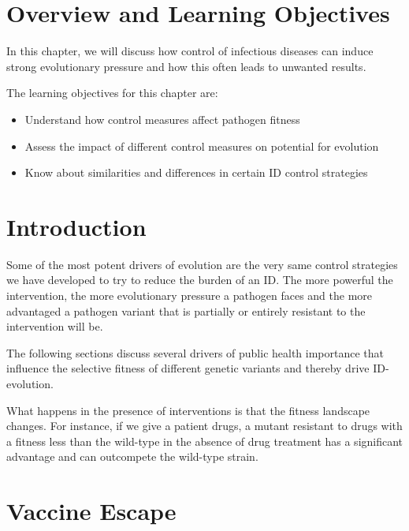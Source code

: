 \documentclass[]{book}
\providecommand{\tightlist}{%
  \setlength{\itemsep}{0pt}\setlength{\parskip}{0pt}}
\theoremstyle{definition}
\theoremstyle{definition}
\theoremstyle{definition}
\theoremstyle{remark}
\begin{document}
\section{Overview and Learning
Objectives}\label{overview-and-learning-objectives-14}

In this chapter, we will discuss how control of infectious diseases can
induce strong evolutionary pressure and how this often leads to unwanted
results.

The learning objectives for this chapter are:

\begin{itemize}
\tightlist
\item
  Understand how control measures affect pathogen fitness
\item
  Assess the impact of different control measures on potential for
  evolution
\item
  Know about similarities and differences in certain ID control
  strategies
\end{itemize}

\section{Introduction}\label{introduction-14}

Some of the most potent drivers of evolution are the very same control
strategies we have developed to try to reduce the burden of an ID. The
more powerful the intervention, the more evolutionary pressure a
pathogen faces and the more advantaged a pathogen variant that is
partially or entirely resistant to the intervention will be.

The following sections discuss several drivers of public health
importance that influence the selective fitness of different genetic
variants and thereby drive ID-evolution.

What happens in the presence of interventions is that the fitness
landscape changes. For instance, if we give a patient drugs, a mutant
resistant to drugs with a fitness less than the wild-type in the absence
of drug treatment has a significant advantage and can outcompete the
wild-type strain.

\section{Vaccine Escape}\label{vaccine-escape}
\end{document}
